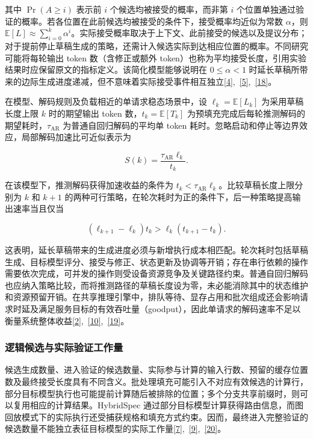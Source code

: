 \documentclass[11pt,a4paper,UTF8,fontset=none,scheme=plain,zihao=-4]{ctexart}
\begin{document}
其中 \(\Pr(A\ge i)\) 表示前 \(i\) 个候选均被接受的概率，而非第 \(i\)
个位置单独通过验证的概率。若各位置在此前候选均被接受的条件下，接受概率均近似为常数
\(\alpha\)，则
\(\mathbb{E}[L]\approx\sum_{i=0}^k\alpha^i\)。实际接受概率取决于上下文、此前接受的候选以及提议分布；对于提前停止草稿生成的策略，还需计入候选实际到达相应位置的概率。不同研究可能将每轮输出
token 数（含修正或额外
token）也称为平均接受长度，引用实验结果时应保留原文的指标定义。该简化模型能够说明在
\(0\leq\alpha<1\)
时延长草稿所带来的边际生成进度递减，但不意味着实际接受事件相互独立\protect\hyperlink{ref-leviathan}{{[}4{]}},~\protect\hyperlink{ref-chen}{{[}5{]}},~\protect\hyperlink{ref-realloss}{{[}18{]}}。

在模型、解码规则及负载相近的单请求稳态场景中，设
\(\ell_k=\mathbb{E}[L_k]\) 为采用草稿长度上限 \(k\) 时的期望输出 token
数，\(t_k=\mathbb{E}[T_k]\)
为预填充完成后每轮推测解码的期望耗时，\(\tau_{\mathrm{AR}}\)
为普通自回归解码的平均单 token
耗时。忽略启动和停止等边界效应，局部解码加速比可近似表示为

\[
S(k)=\frac{\tau_{\mathrm{AR}}\ell_k}{t_k}.
\]

在该模型下，推测解码获得加速收益的条件为
\(t_k<\tau_{\mathrm{AR}}\ell_k\)。比较草稿长度上限分别为 \(k\) 和
\(k+1\)
的两种可行策略，在轮次耗时为正的条件下，后一种策略提高输出速率当且仅当

\[
(\ell_{k+1}-\ell_k)t_k>\ell_k(t_{k+1}-t_k).
\]

这表明，延长草稿带来的生成进度必须与新增执行成本相匹配。轮次耗时包括草稿生成、目标模型评分、接受与修正、状态更新及协调等开销；存在串行依赖的操作需要依次完成，可并发的操作则受设备资源竞争及关键路径约束。普通自回归解码也应纳入策略比较，而将推测路径的草稿长度设为零，未必能消除其中的状态维护和资源预留开销。在共享推理引擎中，排队等待、显存占用和批次组成还会影响请求时延及满足服务目标的有效吞吐量（goodput），因此单请求的解码速率不足以衡量系统整体收益\protect\hyperlink{ref-magicdec}{{[}2{]}},~\protect\hyperlink{ref-smartspec}{{[}10{]}},~\protect\hyperlink{ref-sglstepzero}{{[}19{]}}。

\hypertarget{section-2-2-2}{%
\subsubsection{逻辑候选与实际验证工作量}\label{section-2-2-2}}

候选生成数量、进入验证的候选数量、实际参与计算的输入行数、预留的缓存位置数及最终接受长度具有不同含义。批处理填充可能引入不对应有效候选的计算行，部分目标模型执行也可能提前计算随后被排除的位置；多个分支共享前缀时，则可以复用相应的计算结果。HybridSpec
通过部分目标模型计算获得路由信息，而图回放模式下的实际执行还受捕获规格和填充方式约束。因而，最终进入完整验证的候选数量不能独立表征目标模型的实际工作量\protect\hyperlink{ref-specinfer}{{[}7{]}},~\protect\hyperlink{ref-hybridspec}{{[}9{]}},~\protect\hyperlink{ref-vllmgraphdocs}{{[}20{]}}。
\end{document}
